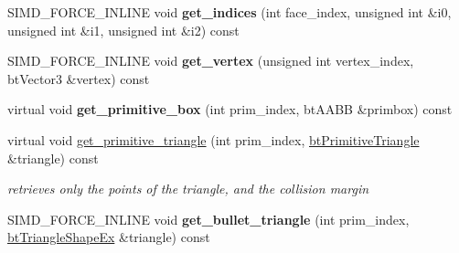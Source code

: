 \begin{DoxyCompactItemize}
\item 
\mbox{\label{classbtGImpactMeshShapePart_1_1TrimeshPrimitiveManager_a1ffd0ccbb9c1dc0254feb7f4c499351d}} 
S\+I\+M\+D\+\_\+\+F\+O\+R\+C\+E\+\_\+\+I\+N\+L\+I\+NE void {\bfseries get\+\_\+indices} (int face\+\_\+index, unsigned int \&i0, unsigned int \&i1, unsigned int \&i2) const
\item 
\mbox{\label{classbtGImpactMeshShapePart_1_1TrimeshPrimitiveManager_a89dde972e76dabc5dcf5832d878f7c5e}} 
S\+I\+M\+D\+\_\+\+F\+O\+R\+C\+E\+\_\+\+I\+N\+L\+I\+NE void {\bfseries get\+\_\+vertex} (unsigned int vertex\+\_\+index, bt\+Vector3 \&vertex) const
\item 
\mbox{\label{classbtGImpactMeshShapePart_1_1TrimeshPrimitiveManager_af577425b36503f969bea9582fc439f07}} 
virtual void {\bfseries get\+\_\+primitive\+\_\+box} (int prim\+\_\+index, bt\+A\+A\+BB \&primbox) const
\item 
\mbox{\label{classbtGImpactMeshShapePart_1_1TrimeshPrimitiveManager_a7932ca8b6bfb549b150859d116bab1ee}} 
virtual void \hyperlink{classbtGImpactMeshShapePart_1_1TrimeshPrimitiveManager_a7932ca8b6bfb549b150859d116bab1ee}{get\+\_\+primitive\+\_\+triangle} (int prim\+\_\+index, \hyperlink{classbtPrimitiveTriangle}{bt\+Primitive\+Triangle} \&triangle) const
\begin{DoxyCompactList}\small\item\em retrieves only the points of the triangle, and the collision margin \end{DoxyCompactList}\item 
\mbox{\label{classbtGImpactMeshShapePart_1_1TrimeshPrimitiveManager_a1eced6a7be515298bb6ccb320d10672f}} 
S\+I\+M\+D\+\_\+\+F\+O\+R\+C\+E\+\_\+\+I\+N\+L\+I\+NE void {\bfseries get\+\_\+bullet\+\_\+triangle} (int prim\+\_\+index, \hyperlink{classbtTriangleShapeEx}{bt\+Triangle\+Shape\+Ex} \&triangle) const
\end{DoxyCompactItemize}
